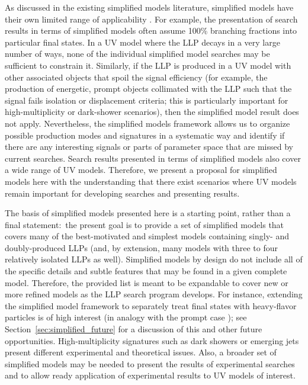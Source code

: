 As discussed in the existing simplified models literature, simplified models have their own limited range of applicability \cite{Alves:2011wf,Abdallah:2015ter}. For example, the presentation of search results in terms of simplified models often assume 100\% branching fractions into particular final states. In a UV model where the LLP decays in a very large number of ways, none of the individual simplified model searches may be sufficient to constrain it. Similarly, if the LLP is produced in a UV model with other associated objects that spoil the signal efficiency (for example, the production of energetic, prompt objects collimated with the LLP such that the signal fails isolation or displacement criteria; this is particularly important for high-multiplicity or dark-shower scenarios), then the simplified model result does not apply. Nevertheless, the simplified models framework allows us to organize possible production modes and signatures in a systematic way and identify if there are any interesting signals or parts of parameter space that are missed by current searches. Search results presented in terms of simplified models also cover a wide range of UV models. Therefore, we present a proposal for simplified models here with the understanding that there exist scenarios where UV models remain important for developing searches and presenting results.

The basis of simplified models presented here is  a starting point, rather than a final statement:~the present goal is to provide a set of simplified models that covers many of the best-motivated and simplest models containing singly- and doubly-produced LLPs (and, by extension, many models with three to four relatively isolated LLPs as well). Simplified models by design do not include all of the specific details and subtle features that may be found in a given complete model.  Therefore, the provided list is meant to be expandable to cover new or more refined models as the LLP search program develops.  For instance,  extending the simplified model framework to separately treat final states with heavy-flavor particles is of high interest (in analogy with the prompt case \cite{Essig:2011qg,Brust:2011tb,Papucci:2011wy}); see Section~\ref{sec:simplified_future} for a discussion of this and other future opportunities.   High-multiplicity signatures such as dark showers or emerging jets present different experimental and theoretical issues. Also, a broader set of simplified models may be needed to present the results of experimental searches and to allow ready application of experimental results to UV models of interest. 


